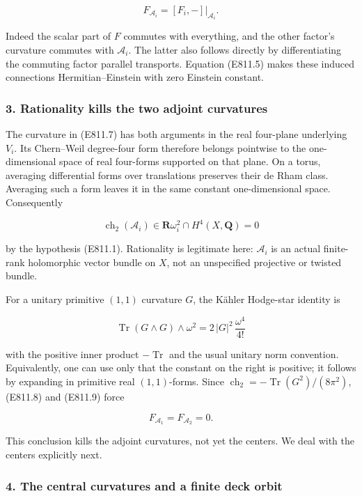 \[
 F_{\mathscr A_i}=[F_i,-]|_{\mathscr A_i}.
 \tag{E811.7}
\]

Indeed the scalar part of \(F\) commutes with everything, and the other
factor's curvature commutes with \(\mathscr A_i\). The latter also
follows directly by differentiating the commuting factor parallel
transports. Equation (E811.5) makes these induced connections
Hermitian--Einstein with zero Einstein constant.

\subsubsection{3. Rationality kills the two adjoint
curvatures}\label{rationality-kills-the-two-adjoint-curvatures}

The curvature in (E811.7) has both arguments in the real four-plane
underlying \(V_i\). Its Chern--Weil degree-four form therefore belongs
pointwise to the one-dimensional space of real four-forms supported on
that plane. On a torus, averaging differential forms over translations
preserves their de Rham class. Averaging such a form leaves it in the
same constant one-dimensional space. Consequently

\[
 \operatorname{ch}_2(\mathscr A_i)\in
       \mathbf R\omega_i^2\cap H^4(X,\mathbf Q)=0
 \tag{E811.8}
\]

by the hypothesis (E811.1). Rationality is legitimate here:
\(\mathscr A_i\) is an actual finite-rank holomorphic vector bundle on
\(X\), not an unspecified projective or twisted bundle.

For a unitary primitive \((1,1)\) curvature \(G\), the Kähler Hodge-star
identity is

\[
 \operatorname{Tr}(G\wedge G)\wedge\omega^2
     =2\,|G|^2\,\frac{\omega^4}{4!}
 \tag{E811.9}
\]

with the positive inner product \(-\operatorname{Tr}\) and the usual
unitary norm convention. Equivalently, one can use only that the
constant on the right is positive; it follows by expanding in primitive
real \((1,1)\)-forms. Since
\(\operatorname{ch}_2=-\operatorname{Tr}(G^2)/(8\pi^2)\), (E811.8) and
(E811.9) force

\[
 F_{\mathscr A_1}=F_{\mathscr A_2}=0.
 \tag{E811.10}
\]

This conclusion kills the adjoint curvatures, not yet the centers. We
deal with the centers explicitly next.

\subsubsection{4. The central curvatures and a finite deck
orbit}\label{the-central-curvatures-and-a-finite-deck-orbit}

